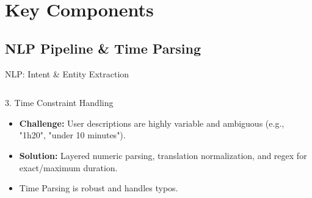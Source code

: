 \documentclass[t, 10pt, handout, aspectratio=169]{beamer}
\begin{document}
\section{Key Components}
\subsection{NLP Pipeline \& Time Parsing}
\begin{frame}{NLP: Intent \& Entity Extraction}
  \begin{columns}
      \begin{block}{3. Time Constraint Handling}
        \begin{itemize}
          \item \textbf{Challenge:} User descriptions are highly variable and ambiguous (e.g., "1h20", "under 10 minutes").
          \item \textbf{Solution:} Layered numeric parsing, translation normalization, and regex for exact/maximum duration.
          \item Time Parsing is robust and handles typos.
        \end{itemize}
      \end{block}
  \end{columns}
\end{frame}
\end{document}
